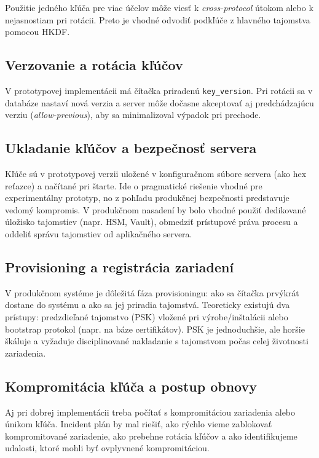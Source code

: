 \documentclass[journal,a4paper,onecolumn]{IEEEtran}
\begin{document}
Použitie jedného kľúča pre viac účelov môže viesť k \emph{cross-protocol} útokom alebo k nejasnostiam pri rotácii. Preto je vhodné odvodiť podkľúče z hlavného tajomstva pomocou HKDF\cite{RFC5869}.

\subsection{Verzovanie a rotácia kľúčov}

V prototypovej implementácii má čítačka priradenú \texttt{key\_version}. Pri rotácii sa v databáze nastaví nová verzia a server môže dočasne akceptovať aj predchádzajúcu verziu (\emph{allow-previous}), aby sa minimalizoval výpadok pri prechode.

\subsection{Ukladanie kľúčov a bezpečnosť servera}

Kľúče sú v prototypovej verzii uložené v konfiguračnom súbore servera (ako hex reťazce) a načítané pri štarte. Ide o pragmatické riešenie vhodné pre experimentálny prototyp, no z pohľadu produkčnej bezpečnosti predstavuje vedomý kompromis. V produkčnom nasadení by bolo vhodné použiť dedikované úložisko tajomstiev (napr. HSM, Vault), obmedziť prístupové práva procesu a oddeliť správu tajomstiev od aplikačného servera.

\subsection{Provisioning a registrácia zariadení}

V produkčnom systéme je dôležitá fáza provisioningu: ako sa čítačka prvýkrát dostane do systému a ako sa jej priradia tajomstvá. Teoreticky existujú dva prístupy: predzdieľané tajomstvo (PSK) vložené pri výrobe/inštalácii alebo bootstrap protokol (napr. na báze certifikátov). PSK je jednoduchšie, ale horšie škáluje a vyžaduje disciplinované nakladanie s tajomstvom počas celej životnosti zariadenia.

\subsection{Kompromitácia kľúča a postup obnovy}

Aj pri dobrej implementácii treba počítať s kompromitáciou zariadenia alebo únikom kľúča. Incident plán by mal riešiť, ako rýchlo vieme zablokovať kompromitované zariadenie, ako prebehne rotácia kľúčov a ako identifikujeme udalosti, ktoré mohli byť ovplyvnené kompromitáciou.
\end{document}
